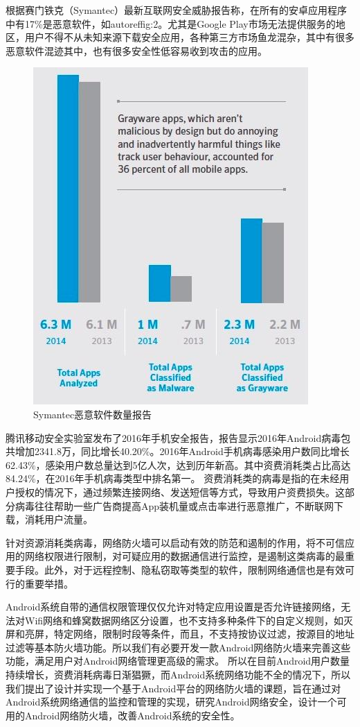 \documentclass[format=final, language=chinese, degree=fyp]{hustthesis}
\begin{document}
根据赛门铁克（Symantec）最新互联网安全威胁报告称，在所有的安卓应用程序中有17\%是恶意软件，如autoref{fig:2}。尤其是Google Play市场无法提供服务的地区，用户不得不从未知来源下载安全应用，各种第三方市场鱼龙混杂，其中有很多恶意软件混迹其中，也有很多安全性低容易收到攻击的应用。

\begin{figure}[h!]
\centering
\includegraphics[width=.4\textwidth]{symantec_report}
\caption{Symantec恶意软件数量报告}\label{fig:2}
\end{figure}

腾讯移动安全实验室发布了2016年手机安全报告，报告显示2016年Android病毒包共增加2341.8万，同比增长40.20\%。2016年Android手机病毒感染用户数同比增长62.43\%，感染用户数总量达到5亿人次，达到历年新高。其中资费消耗类占比高达84.24\%，在2016年手机病毒类型中排名第一。
资费消耗类的病毒是指的在未经用户授权的情况下，通过频繁连接网络、发送短信等方式，导致用户资费损失。这部分病毒往往帮助一些广告商提高App装机量或点击率进行恶意推广，不断联网下载，消耗用户流量。

针对资源消耗类病毒，网络防火墙可以启动有效的防范和遏制的作用，将不可信应用的网络权限进行限制，对可疑应用的数据通信进行监控，是遏制这类病毒的最重要手段。此外，对于远程控制、隐私窃取等类型的软件，限制网络通信也是有效可行的重要举措。

Android系统自带的通信权限管理仅仅允许对特定应用设置是否允许链接网络，无法对Wifi网络和蜂窝数据网络区分设置，也不支持多种条件下的自定义规则，如灭屏和亮屏，特定网络，限制时段等条件，而且，不支持按协议过滤，按源目的地址过滤等基本防火墙功能。所以我们有必要开发一款Android网络防火墙来完善这些功能，满足用户对Android网络管理更高级的需求。
所以在目前Android用户数量持续增长，资费消耗病毒日渐猖獗，而Android系统网络功能不全的情况下，所以我们提出了设计并实现一个基于Android平台的网络防火墙的课题，旨在通过对Android系统网络通信的监控和管理的实现，研究Android网络安全，设计一个可用的Android网络防火墙，改善Android系统的安全性。
\end{document}
